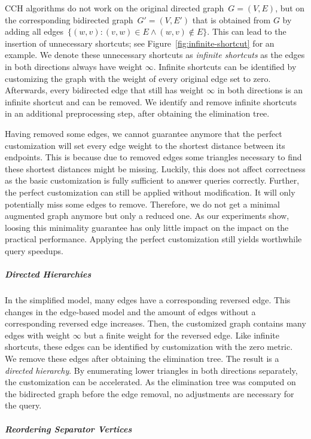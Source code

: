 \documentclass[a4paper, english, cleveref]{lipics-v2021}
\begin{document}
CCH algorithms do not work on the original directed graph~$G = (V, E)$, but on the corresponding bidirected graph~$G' = (V, E')$ that is obtained from $G$ by adding all edges~$\{(w, v): (v, w) \in E \land (w, v) \notin E\}$.
This can lead to the insertion of unnecessary shortcuts; see Figure~\ref{fig:infinite-shortcut} for an example.
We denote these unnecessary shortcuts as \emph{infinite shortcuts} as the edges in both directions always have weight $\infty$.
Infinite shortcuts can be identified by customizing the graph with the weight of every original edge set to zero.
Afterwards, every bidirected edge that still has weight $\infty$ in both directions is an infinite shortcut and can be removed.
We identify and remove infinite shortcuts in an additional preprocessing step, after obtaining the elimination tree.

Having removed some edges, we cannot guarantee anymore that the perfect customization will set every edge weight to the shortest distance between its endpoints.
This is because due to removed edges some triangles necessary to find these shortest distances might be missing.
Luckily, this does not affect correctness as the basic customization is fully sufficient to answer queries correctly.
Further, the perfect customization can still be applied without modification.
It will only potentially miss some edges to remove.
Therefore, we do not get a minimal augmented graph anymore but only a reduced one.
As our experiments show, loosing this minimality guarantee has only little impact on the impact on the practical performance.
Applying the perfect customization still yields worthwhile query speedups.

\subparagraph*{Directed Hierarchies}

In the simplified model, many edges have a corresponding reversed edge.
This changes in the edge-based model and the amount of edges without a corresponding reversed edge increases.
Then, the customized graph contains many edges with weight $\infty$ but a finite weight for the reversed edge.
Like infinite shortcuts, these edges can be identified by customization with the zero metric.
We remove these edges after obtaining the elimination tree.
The result is a \emph{directed hierarchy}.
By enumerating lower triangles in both directions separately, the customization can be accelerated.
As the elimination tree was computed on the bidirected graph before the edge removal, no adjustments are necessary for the query.

\subparagraph*{Reordering Separator Vertices}
\end{document}
